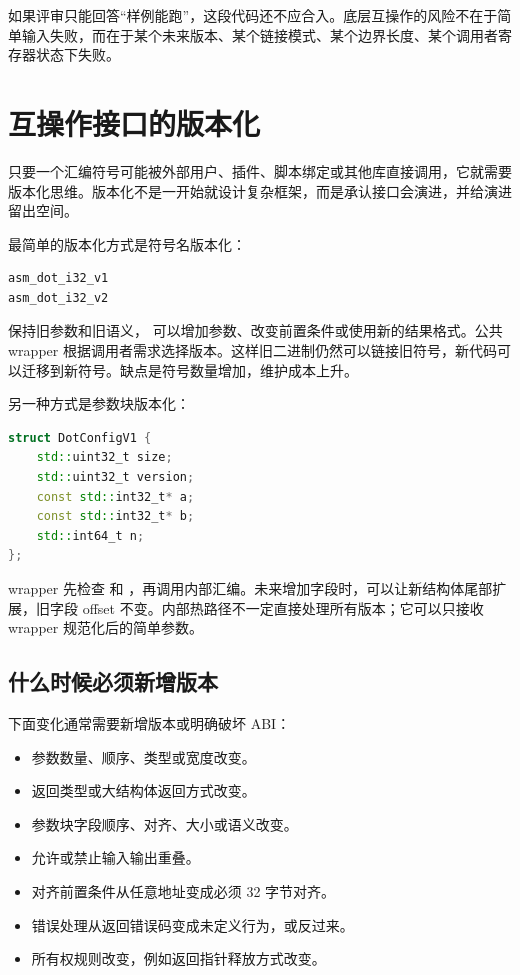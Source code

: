 如果评审只能回答“样例能跑”，这段代码还不应合入。底层互操作的风险不在于简单输入失败，而在于某个未来版本、某个链接模式、某个边界长度、某个调用者寄存器状态下失败。

\section{互操作接口的版本化}

只要一个汇编符号可能被外部用户、插件、脚本绑定或其他库直接调用，它就需要版本化思维。版本化不是一开始就设计复杂框架，而是承认接口会演进，并给演进留出空间。

最简单的版本化方式是符号名版本化：

\begin{lstlisting}
asm_dot_i32_v1
asm_dot_i32_v2
\end{lstlisting}

 保持旧参数和旧语义， 可以增加参数、改变前置条件或使用新的结果格式。公共 wrapper 根据调用者需求选择版本。这样旧二进制仍然可以链接旧符号，新代码可以迁移到新符号。缺点是符号数量增加，维护成本上升。

另一种方式是参数块版本化：

\begin{lstlisting}[language=C++]
struct DotConfigV1 {
    std::uint32_t size;
    std::uint32_t version;
    const std::int32_t* a;
    const std::int32_t* b;
    std::int64_t n;
};
\end{lstlisting}

wrapper 先检查  和 ，再调用内部汇编。未来增加字段时，可以让新结构体尾部扩展，旧字段 offset 不变。内部热路径不一定直接处理所有版本；它可以只接收 wrapper 规范化后的简单参数。

\subsection{什么时候必须新增版本}

下面变化通常需要新增版本或明确破坏 ABI：

\begin{itemize}
  \item 参数数量、顺序、类型或宽度改变。
  \item 返回类型或大结构体返回方式改变。
  \item 参数块字段顺序、对齐、大小或语义改变。
  \item 允许或禁止输入输出重叠。
  \item 对齐前置条件从任意地址变成必须 32 字节对齐。
  \item 错误处理从返回错误码变成未定义行为，或反过来。
  \item 所有权规则改变，例如返回指针释放方式改变。
\end{itemize}

